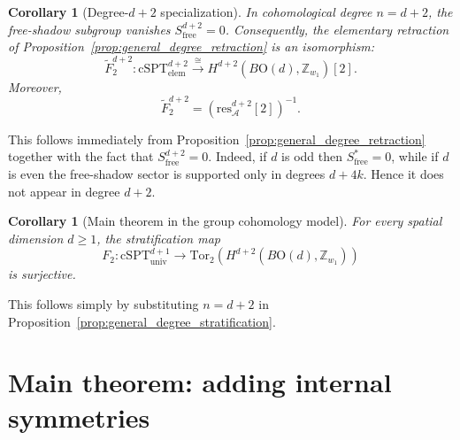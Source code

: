 \documentclass[aps,prx,reprint,superscriptaddress,twocolumn,amsmath,amssymb,amsfonts, nofootinbib]{revtex4-2}
\newcommand{\res}{\text{res}}
\newcommand{\tor}{\text{Tor}}
\theoremstyle{apsstyle}
\newtheorem{corollary}[theorem]{Corollary}
\begin{document}
\bigskip 

\begin{corollary}[Degree-$d+2$ specialization]
\label{cor:degree_dplus2_retraction_isomorphism}
In cohomological degree $n=d+2$, the free-shadow subgroup vanishes $S_{\mathrm{free}}^{d+2}=0$. Consequently, the elementary retraction of Proposition~\ref{prop:general_degree_retraction} is an isomorphism:
\begin{equation}
\widetilde F_2^{d+2}:
\mathrm{cSPT}_{\mathrm{elem}}^{d+2}
\xrightarrow{\cong}
H^{d+2}(B\mathrm{O}(d),\mathbb Z_{w_1})[2].
\end{equation}
Moreover,
\begin{equation}
\widetilde F_2^{d+2}
=
\left(\res_{\mathcal A}^{d+2}[2]\right)^{-1}.
\end{equation}
\end{corollary}

\bigskip 

\noindent \noindent This follows immediately from Proposition~\ref{prop:general_degree_retraction} together with the fact that $S_{\mathrm{free}}^{d+2}=0$. Indeed, if $d$ is odd then $S_{\mathrm{free}}^*=0$, while if $d$ is even the free-shadow sector is supported only in degrees $d+4k$. Hence it does not appear in degree $d+2$. 

\bigskip 

\begin{corollary}[Main theorem in the group cohomology model]
\label{cor:main_theorem_group_cohomology}
For every spatial dimension $d\geq 1$, the stratification map
\begin{equation}
F_2:
\mathrm{cSPT}_{\mathrm{univ}}^{d+1}
\longrightarrow
\tor_2\left(H^{d+2}(B\mathrm{O}(d),\mathbb Z_{w_1})\right)
\end{equation}
is surjective.
\end{corollary}

\bigskip 
\noindent This follows simply by substituting $n=d+2$ in Proposition~\ref{prop:general_degree_stratification}.







\section{Main theorem: adding internal symmetries}
\label{app:canon_factor_H}
\end{document}
